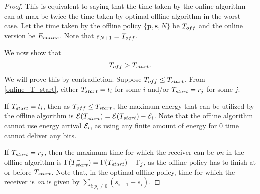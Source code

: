 \begin{proof}
This is equivalent to saying that the time taken by the online algorithm can at max be twice the time taken by optimal offline algorithm in the worst case. Let the time taken by the offline policy $\{\bm{p},\bm{s},N\}$  be $T_{\mbox{\scriptsize{off}}}$ and the online version be $E_{\mbox{\scriptsize{online}}}$. Note that $s_{N+1}=T_{\mbox{\scriptsize{off}}}$.

We now show that 
\begin{align}
T_{\mbox{\scriptsize{off}}} > T_{\mbox{\scriptsize{start}}}.
\label{online_time}
\end{align}
We will prove this by contradiction. Suppose $T_{\mbox{\scriptsize{off}}}\le T_{\mbox{\scriptsize{start}}}$. From \eqref{online_T_start}, either $T_{\mbox{\scriptsize{start}}}=t_i$ for some $i$ and/or $T_{\mbox{\scriptsize{start}}}=r_j$ for some $j$.

If $T_{\mbox{\scriptsize{start}}}=t_i$, then as $T_{\mbox{\scriptsize{off}}}\le T_{\mbox{\scriptsize{start}}}$, the maximum energy that can be utilized by the offline algorithm is $\ETx(T_{\mbox{\scriptsize{start}}}^-)=\ETx(T_{\mbox{\scriptsize{start}}})-\ETx_i$. Note that the offline algorithm cannot use energy arrival $\mathcal{E}_i$, as using any finite amount of energy for 0 time cannot deliver any bits. 

If $T_{\mbox{\scriptsize{start}}}=r_j$, then the maximum time for which the receiver can be \textit{on} in the offline algorithm is $\TRx(T_{\mbox{\scriptsize{start}}}^-)=\TRx(T_{\mbox{\scriptsize{start}}})-\TRx_j$, as the offline policy has to finish at or before $T_{\mbox{\scriptsize{start}}}$. Note that, in the optimal offline policy, time for which the receiver is \textit{on} is given by $\displaystyle \sum_{i:p_i\neq 0}(s_{i+1}-s_i)$. 


\end{proof}
